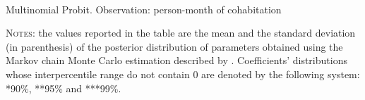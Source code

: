 \documentclass[12pt]{article}
\numberwithin{table}{section}
\begin{document}
	\begin{table}[htbp]\centering
		\caption{\\Multinomial Probit. Observation: person-month of cohabitation}
		\label{table:mpc}
		\begin{threeparttable}[t]\centering
			
			\begin{tablenotes}[flushleft]
				\footnotesize{\item \textsc{Notes}: the values reported in the table are the mean and the standard deviation (in parenthesis) of the posterior distribution of parameters obtained using the Markov chain Monte Carlo estimation described by \cite{imai2005a}.
				Coefficients' distributions whose interpercentile range do not contain 0 are denoted by the following system: *90\%, **95\%  and ***99\%.}
			\end{tablenotes}
		\end{threeparttable}
	\end{table}

\FloatBarrier
\FloatBarrier
\end{document}
